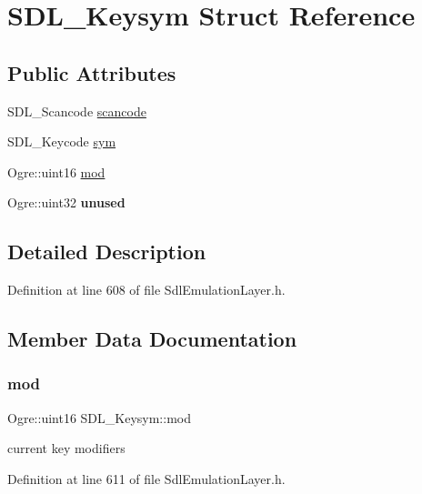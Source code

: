 \hypertarget{struct_s_d_l___keysym}{}\section{S\+D\+L\+\_\+\+Keysym Struct Reference}
\label{struct_s_d_l___keysym}
\subsection*{Public Attributes}
\begin{DoxyCompactItemize}
\item 
S\+D\+L\+\_\+\+Scancode \hyperlink{struct_s_d_l___keysym_ad47e9120a511e2efc7ec0c6d8a5ec51e}{scancode}
\item 
S\+D\+L\+\_\+\+Keycode \hyperlink{struct_s_d_l___keysym_a082ff1fd787b79fa6c3a445deb225f08}{sym}
\item 
Ogre\+::uint16 \hyperlink{struct_s_d_l___keysym_a4cbea3e7dd2e50cc57fe05c3af3921fc}{mod}
\item 
\mbox{\label{struct_s_d_l___keysym_a423ef40f9956ee0fe3dc9690189461a3}} 
Ogre\+::uint32 {\bfseries unused}
\end{DoxyCompactItemize}


\subsection{Detailed Description}


Definition at line 608 of file Sdl\+Emulation\+Layer.\+h.



\subsection{Member Data Documentation}
\mbox{\label{struct_s_d_l___keysym_a4cbea3e7dd2e50cc57fe05c3af3921fc}} 
\subsubsection{\texorpdfstring{mod}{mod}}
{\footnotesize\ttfamily Ogre\+::uint16 S\+D\+L\+\_\+\+Keysym\+::mod}

current key modifiers 

Definition at line 611 of file Sdl\+Emulation\+Layer.\+h.

